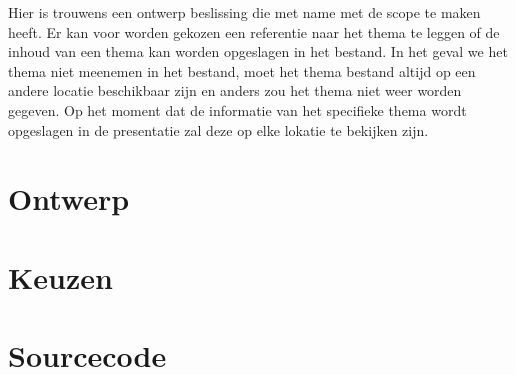 \documentclass[a4paper]{article}
\begin{document}
Hier is trouwens een ontwerp beslissing die met name met de scope te maken heeft. Er kan voor worden gekozen een referentie naar het thema te leggen of de inhoud van een thema kan worden opgeslagen in het bestand. In het geval we het thema niet meenemen in het bestand, moet het thema bestand altijd op een andere locatie beschikbaar zijn en anders zou het thema niet weer worden gegeven. Op het moment dat de informatie van het specifieke thema wordt opgeslagen in de presentatie zal deze op elke lokatie te bekijken zijn.


\section{Ontwerp}


\section{Keuzen}



\section{Sourcecode}
\end{document}
